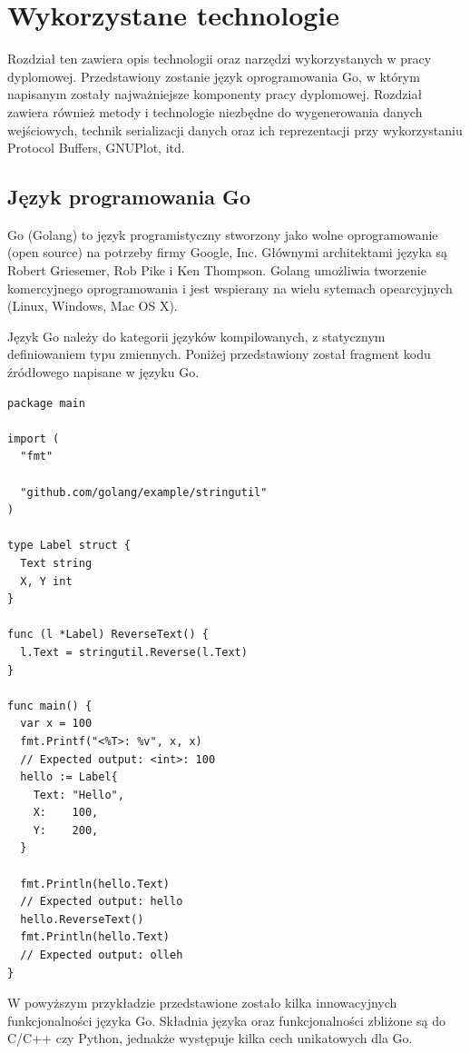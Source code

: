 \documentclass[a4paper,12pt,twoside,openany]{report}
\begin{document}
\chapter{Wykorzystane technologie}

Rozdział ten zawiera opis technologii oraz narzędzi wykorzystanych w pracy dyplomowej. 
Przedstawiony zostanie język oprogramowania Go, w którym napisanym zostały najważniejsze komponenty pracy dyplomowej. Rozdział zawiera również
metody i technologie niezbędne do wygenerowania danych wejściowych, technik serializacji danych oraz ich reprezentacji przy wykorzystaniu
Protocol Buffers, GNUPlot, itd.

\section{Język programowania Go}
Go (Golang) to język programistyczny stworzony jako wolne oprogramowanie (open source) na potrzeby firmy Google, Inc. 
Głównymi architektami języka są Robert Griesemer, Rob Pike i Ken Thompson.
Golang umożliwia tworzenie komercyjnego oprogramowania i jest wspierany na wielu sytemach opearcyjnych (Linux, Windows, Mac OS X).

Język Go należy do kategorii języków kompilowanych, z statycznym definiowaniem typu zmiennych. 
Poniżej przedstawiony został fragment kodu źródłowego napisane w języku Go.

\begin{lstlisting}
package main

import (
  "fmt"

  "github.com/golang/example/stringutil"
)

type Label struct {
  Text string
  X, Y int
}

func (l *Label) ReverseText() {
  l.Text = stringutil.Reverse(l.Text)
}

func main() {
  var x = 100
  fmt.Printf("<%T>: %v", x, x)
  // Expected output: <int>: 100
  hello := Label{
    Text: "Hello",
    X:    100,
    Y:    200,
  }
  
  fmt.Println(hello.Text)
  // Expected output: hello
  hello.ReverseText()
  fmt.Println(hello.Text)
  // Expected output: olleh
}

\end{lstlisting}

W powyższym przykładzie przedstawione zostało kilka innowacyjnych funkcjonalności języka Go.
Składnia języka oraz funkcjonalności zbliżone są do C/C++ czy Python, jednakże występuje kilka cech unikatowych dla Go.
\end{document}
